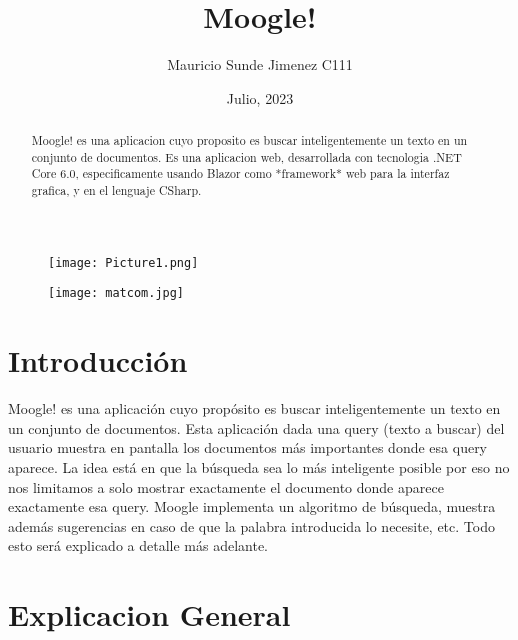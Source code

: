 \documentclass[a4paper,12pt]{article}
\begin{document}
\title{Moogle!}
\author{Mauricio Sunde Jimenez C111}
\date{Julio, 2023}
\maketitle

\begin{figure}[h]
    \center
    \texttt{[image: Picture1.png]}
\end{figure}

\begin{figure}[h]
    \center
    \texttt{[image: matcom.jpg]}
    \label{fig:logo}
\end{figure}

\begin{abstract}
    Moogle! es una aplicacion cuyo proposito es buscar inteligentemente un texto en un conjunto de documentos. Es una aplicacion web, desarrollada con tecnologia .NET Core 6.0, especificamente usando Blazor como *framework* web para la interfaz grafica, y en el lenguaje CSharp.
\end{abstract}

\section {Introducción}\label{sec:intro}

Moogle! es una aplicación cuyo propósito es buscar inteligentemente un texto en un conjunto de documentos. Esta aplicación dada una query (texto a buscar) del usuario muestra en pantalla los documentos más importantes donde esa query aparece. La idea está en que la búsqueda sea lo más inteligente posible por eso no nos limitamos a solo mostrar exactamente el documento donde aparece exactamente esa query. Moogle implementa un algoritmo de búsqueda, muestra además sugerencias en caso de que la palabra introducida lo necesite, etc. Todo esto será explicado a detalle más adelante.

\section{Explicacion General}\label{sec: General}
\end{document}
